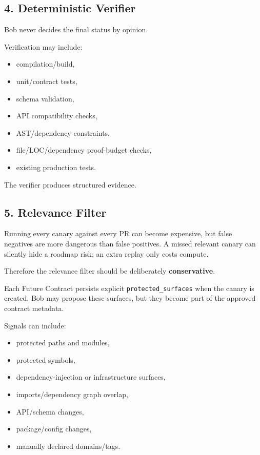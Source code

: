 \documentclass[12pt]{article}
\begin{document}
\subsection{4. Deterministic Verifier}

Bob never decides the final status by opinion.

Verification may include:

\begin{itemize}
    \item compilation/build,
    \item unit/contract tests,
    \item schema validation,
    \item API compatibility checks,
    \item AST/dependency constraints,
    \item file/LOC/dependency proof-budget checks,
    \item existing production tests.
\end{itemize}

The verifier produces structured evidence.

\subsection{5. Relevance Filter}

Running every canary against every PR can become expensive, but false negatives are more dangerous than false positives. A missed relevant canary can silently hide a roadmap risk; an extra replay only costs compute.

Therefore the relevance filter should be deliberately \textbf{conservative}.

Each Future Contract persists explicit \texttt{protected\_surfaces} when the canary is created. Bob may propose these surfaces, but they become part of the approved contract metadata.

Signals can include:

\begin{itemize}
    \item protected paths and modules,
    \item protected symbols,
    \item dependency-injection or infrastructure surfaces,
    \item imports/dependency graph overlap,
    \item API/schema changes,
    \item package/config changes,
    \item manually declared domains/tags.
\end{itemize}
\end{document}
